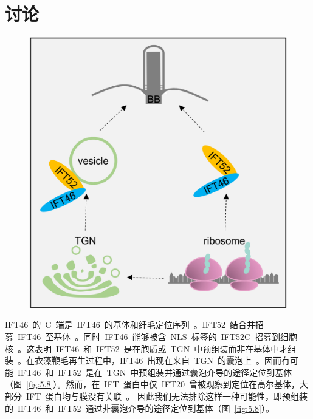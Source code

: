 \section{讨论}
\begin{figure}[htbp]
\centering
\graphicspath{{figures/}}
\includegraphics[width=\textwidth-80mm]{fig5-8.jpg}
{
\par}
\end{figure}

IFT46\ 的\ C\ 端是\ IFT46\ 的基体和纤毛定位序列\ \citep{Lv2017}。IFT52\ 结合并招募\ IFT46\ 至基体\ \citep{Lv2017}。同时\ IFT46\ 能够被含\ NLS\ 标签的\ IFT52C\ 招募到细胞核\ \citep{Lv2017}。这表明\ IFT46\ 和\ IFT52\ 是在胞质或\ TGN\ 中预组装而非在基体中才组装\ \citep{Lv2017}。在衣藻鞭毛再生过程中，IFT46\ 出现在来自\ TGN\ 的囊泡上\ \citep{Wood2014}。因而有可能\ IFT46\ 和\ IFT52\ 是在\ TGN\ 中预组装并通过囊泡介导的途径定位到基体（图\ \ref{fig:5.8}）。然而，在\ IFT\ 蛋白中仅\ IFT20\ 曾被观察到定位在高尔基体，大部分\ IFT\ 蛋白均与膜没有关联\
\citep{Richey2012,Follit2006}。 因此我们无法排除这样一种可能性，即预组装的\ IFT46\ 和\ IFT52\ 通过非囊泡介导的途径定位到基体（图\ \ref{fig:5.8}）。


